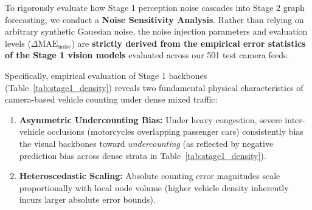 \documentclass[journal,twocolumn]{IEEEtran}
\begin{document}
To rigorously evaluate how Stage 1 perception noise cascades into Stage 2 graph forecasting, we conduct a \textbf{Noise Sensitivity Analysis}. Rather than relying on arbitrary synthetic Gaussian noise, the noise injection parameters and evaluation levels ($\Delta \text{MAE}_{\text{noise}}$) are \textbf{strictly derived from the empirical error statistics of the Stage 1 vision models} evaluated across our 501 test camera feeds.

Specifically, empirical evaluation of Stage 1 backbones (Table~\ref{tab:stage1_density}) reveals two fundamental physical characteristics of camera-based vehicle counting under dense mixed traffic:
\begin{enumerate}
    \item \textbf{Asymmetric Undercounting Bias:} Under heavy congestion, severe inter-vehicle occlusions (motorcycles overlapping passenger cars) consistently bias the visual backbones toward \emph{undercounting} (as reflected by negative prediction bias across dense strata in Table~\ref{tab:stage1_density}).
    \item \textbf{Heteroscedastic Scaling:} Absolute counting error magnitudes scale proportionally with local node volume (higher vehicle density inherently incurs larger absolute error bounds).
\end{enumerate}
\end{document}
